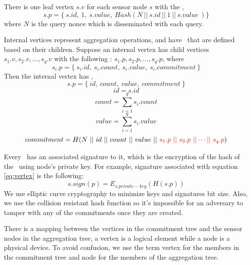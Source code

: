 	There is one leaf vertex $s.v$ for each sensor node $s$ with the \payload,
	\begin{equation}\label{eq:vertex}
		s.p = \{\ s.id,\ 1,\ s.value,\ Hash( N\ ||\  s.id\ ||\  1\  ||\  s.value\ ) \} 
	\end{equation}
	where $N$ is the query nonce which is disseminated with each query.

	Internal vertices represent aggregation operations, and have \payloads\  that are defined based on their children. Suppose an internal vertex has child vertices $s_{1}.v, s_{2}.v,\dotsc, s_{q}.v$ with the following \payloads: $s_{1}.p, s_{2}.p,\dotsc, s_{q}.p$, where
	\begin{equation}\label{def:internal-vertice}
		s_{i}.p = \{\ s_{i}.id,\ s_{i}.count,\ s_{i}.value,\ s_{i}.commitment\ \}
	\end{equation}
	Then the internal vertex has \payload, 
	\begin{equation}
		s.p = \{\ id,\ count,\ value,\ commitment\ \} 
	\end{equation}
	\begin{equation}
		id = s.id 
	\end{equation}	
	\begin{equation}
		count = \sum\limits_{i=1}^q {s_{i}.count}		
	\end{equation}
	\begin{equation}
		value = \sum\limits_{i=1}^q {s_{i}.value}		
	\end{equation}
	\begin{equation}
		commitment = H (N\ ||\ id\ ||\ count\ ||\ value\ ||\textcolor{red}{\ s_{1}.p\ ||\ s_{2}.p\ || \dotsb ||\ s_{q}.p})		
	\end{equation}

	Every \payload\ has an associated signature to it, which is the encryption of the hash of the \payload\ using node's private key. For example, signature associated with equation \ref{eq:vertex} is the following:  
	\begin{equation}
		s.sign(p) = E_{s.{private-key}}(H (s.p))
	\end{equation}
	We use elliptic curve cryptography to minimize keys and signatures bit size. 
	Also, we use the collision resistant hash function so it's impossible for an adversary to tamper with any of the commitments once they are created.	

	There is a mapping between the vertices in the commitment tree and the sensor nodes in the aggregation tree, a vertex is a logical element while a node is a physical device.
	To avoid confusion, we use the term vertex for the members in the commitment tree and node for the members of the aggregation tree.
	
